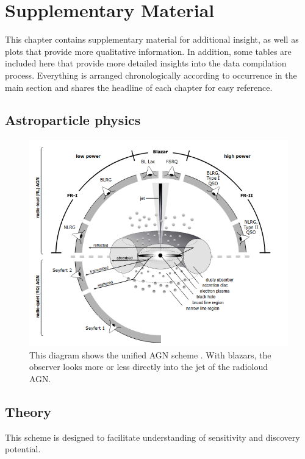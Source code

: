\chapter{Supplementary Material} \label{sec:appendix}

This chapter contains supplementary material for additional insight, as well as plots that provide more qualitative information.
In addition, some tables are included here that provide more detailed insights into the data compilation process.
Everything is arranged chronologically according to occurrence in the main section and shares the headline of each chapter for easy reference.

\section{Astroparticle physics}

\begin{figure}
    \centering
    \includegraphics[width=\linewidth]{Plots/appendix/agn.png}
    \caption{This diagram shows the unified AGN scheme \cite{agn}. With blazars, the observer looks more or less directly into the jet of the radioloud AGN.}
    \label{fig:agn}
\end{figure}

\section{Theory}

This scheme is designed to facilitate understanding of sensitivity and discovery potential.

